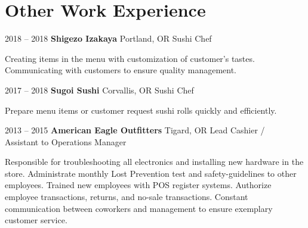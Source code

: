 \documentclass{tccv}
\begin{document}
\section{Other Work Experience}
	 \begin{eventlist}
		 \item {2018 -- 2018}
			 {\textbf{Shigezo Izakaya}                 Portland, OR}
			 {Sushi Chef}

			Creating items in the menu with customization of customer's tastes. 
			Communicating with customers to ensure quality management. 

		\item {2017 -- 2018}
			{\textbf{Sugoi Sushi}                          Corvallis, OR}
			{Sushi Chef}

			Prepare menu items or customer request sushi rolls quickly and efficiently.
			
		\item {2013 -- 2015}
			{\textbf{American Eagle Outfitters}     Tigard, OR}
			{Lead Cashier /\\ Assistant to Operations Manager}
			
			Responsible for troubleshooting all electronics and installing new hardware in the store. 
			Administrate monthly Lost Prevention test and safety-guidelines to other employees.
			Trained new employees with POS register systems. 
			Authorize employee transactions, returns, and no-sale transactions.
			Constant communication between coworkers and management to ensure exemplary customer service.

	\end{eventlist}


		
		
\end{document}
